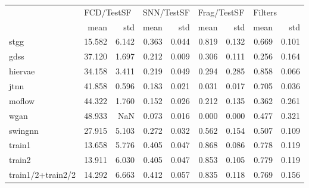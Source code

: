 \begin{tabular}{lrrrrrrrr}
\toprule
{} & \multicolumn{2}{l}{FCD/TestSF} & \multicolumn{2}{l}{SNN/TestSF} & \multicolumn{2}{l}{Frag/TestSF} & \multicolumn{2}{l}{Filters} \\
{} &       mean &    std &       mean &    std &        mean &    std &    mean &    std \\
\midrule
stgg              &     15.582 &  6.142 &      0.363 &  0.044 &       0.819 &  0.132 &   0.669 &  0.101 \\
gdss              &     37.120 &  1.697 &      0.212 &  0.009 &       0.306 &  0.111 &   0.256 &  0.164 \\
hiervae           &     34.158 &  3.411 &      0.219 &  0.049 &       0.294 &  0.285 &   0.858 &  0.066 \\
jtnn              &     41.858 &  0.596 &      0.183 &  0.021 &       0.031 &  0.017 &   0.705 &  0.036 \\
moflow            &     44.322 &  1.760 &      0.152 &  0.026 &       0.212 &  0.135 &   0.362 &  0.261 \\
wgan              &     48.933 &    NaN &      0.073 &  0.016 &       0.000 &  0.000 &   0.477 &  0.321 \\
swingnn           &     27.915 &  5.103 &      0.272 &  0.032 &       0.562 &  0.154 &   0.507 &  0.109 \\
train1            &     13.658 &  5.776 &      0.405 &  0.047 &       0.868 &  0.086 &   0.778 &  0.119 \\
train2            &     13.911 &  6.030 &      0.405 &  0.047 &       0.853 &  0.105 &   0.779 &  0.119 \\
train1/2+train2/2 &     14.292 &  6.663 &      0.412 &  0.057 &       0.835 &  0.118 &   0.769 &  0.156 \\
\bottomrule
\end{tabular}
